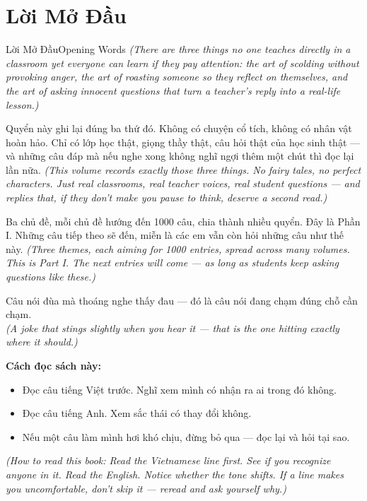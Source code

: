 \chapter*{Lời Mở Đầu}

\begin{truyen}{Lời Mở Đầu}{Opening Words}
\textit{(There are three things no one teaches directly in a classroom yet everyone can learn if they pay attention: the art of scolding without provoking anger, the art of roasting someone so they reflect on themselves, and the art of asking innocent questions that turn a teacher's reply into a real-life lesson.)}

Quyển này ghi lại đúng ba thứ đó. Không có chuyện cổ tích, không có nhân vật hoàn hảo. Chỉ có lớp học thật, giọng thầy thật, câu hỏi thật của học sinh thật --- và những câu đáp mà nếu nghe xong không nghĩ ngợi thêm một chút thì đọc lại lần nữa.
\textit{(This volume records exactly those three things. No fairy tales, no perfect characters. Just real classrooms, real teacher voices, real student questions — and replies that, if they don't make you pause to think, deserve a second read.)}

Ba chủ đề, mỗi chủ đề hướng đến 1000 câu, chia thành nhiều quyển. Đây là Phần I. Những câu tiếp theo sẽ đến, miễn là các em vẫn còn hỏi những câu như thế này.
\textit{(Three themes, each aiming for 1000 entries, spread across many volumes. This is Part I. The next entries will come — as long as students keep asking questions like these.)}
\end{truyen}

\begin{baihoc}
Câu nói đùa mà thoáng nghe thấy đau — đó là câu nói đang chạm đúng chỗ cần chạm.\\
\textit{(A joke that stings slightly when you hear it — that is the one hitting exactly where it should.)}
\end{baihoc}

\ngancach

\begin{tuhocnhanh}
\textbf{Cách đọc sách này:}\\[4pt]
\begin{itemize}[leftmargin=*]
  \item Đọc câu tiếng Việt trước. Nghĩ xem mình có nhận ra ai trong đó không.
  \item Đọc câu tiếng Anh. Xem sắc thái có thay đổi không.
  \item Nếu một câu làm mình hơi khó chịu, đừng bỏ qua --- đọc lại và hỏi tại sao.
\end{itemize}
\textit{(How to read this book: Read the Vietnamese line first. See if you recognize anyone in it. Read the English. Notice whether the tone shifts. If a line makes you uncomfortable, don't skip it --- reread and ask yourself why.)}
\end{tuhocnhanh}
